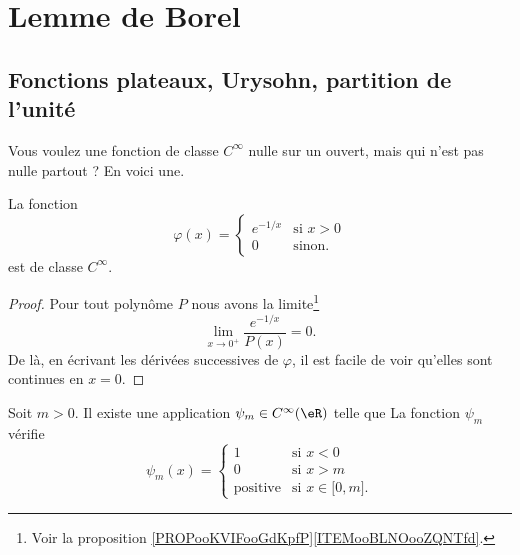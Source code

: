\section{Lemme de Borel}

\subsection{Fonctions plateaux, Urysohn, partition de l'unité}
\label{subsecOSYAooXXCVjv}


Vous voulez une fonction de classe \( C^{\infty}\) nulle sur un ouvert, mais qui n'est pas nulle partout ? En voici une.
\begin{lemma}       \label{LEMooFLUSooKaZRRY}
    La fonction
\begin{equation}
    \varphi(x)=\begin{cases}
        e^{-1/x}    &   \text{si } x>0\\
        0    &    \text{sinon}.
    \end{cases}
\end{equation}
    est de classe \(  C^{\infty}\).
\end{lemma}

\begin{proof}
    Pour tout polynôme \( P\) nous avons la limite\footnote{Voir la proposition \ref{PROPooKVIFooGdKpfP}\ref{ITEMooBLNOooZQNTfd}.}
\begin{equation}
    \lim_{x\to 0^+} \frac{ e^{-1/x} }{ P(x)} =0 .
\end{equation}
    De là, en écrivant les dérivées successives de \( \varphi\), il est facile de voir qu'elles sont continues en \( x=0\).
\end{proof}


\begin{lemma}       \label{LEMooRVSIooKcpWoK}
    Soit \( m>0\). Il existe une application \( \psi_m\in  C^{\infty}(\eR)\) telle que
La fonction \( \psi_m\) vérifie
\begin{equation}
    \psi_m(x)=\begin{cases}
        1    &   \text{si } x<0\\
        0    &    \text{si } x>m\\
        \text{positive} &\text{si } x\in\mathopen[ 0 , m \mathclose].
    \end{cases}
\end{equation}
\end{lemma}
 

